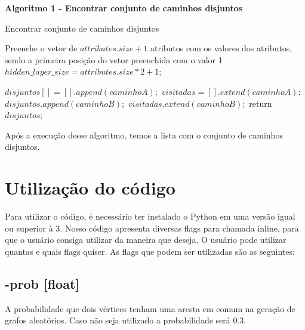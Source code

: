 \begin{center}	
         \textbf{Algoritmo 1 -  Encontrar conjunto de caminhos disjuntos}
	\vspace{-0.3cm}
\begin{minipage}[ht]{13cm}
\begin{algorithm}[H]
  \footnotesize
  \caption{Encontrar conjunto de caminhos disjuntos}
  \label{alg:rnagenerica}
  \begin{algorithmic}[1]
    \STATE Preenche o vetor de $attributes.size+1$ atributos com os valores dos atributos, sendo a primeira posição do vetor preenchida com o valor 1
		\STATE $hidden\_layer\_size =  attributes.size*2+1;$

        \STATE $disjuntos[] = [].append(caminhoA);$
        \STATE $visitadas = [].extend(caminhoA);$
                \STATE $disjuntos.append(caminhoB);$
                \STATE $visitadas.extend(caminhoB);$
            \ENDIF
        \ENDFOR
            \STATE return $disjuntos;$
        \ENDIF
    \ENDFOR
  \end{algorithmic}
\end{algorithm}

\end{minipage}
\end{center}

Após a execução desse algoritmo, temos a lista com o conjunto de caminhos disjuntos.

\section{\esp Utilização do código}
Para utilizar o código, é necessário ter instalado o Python em uma versão igual ou superior à 3. Nosso código apresenta diversas flags para chamada inline, para que o usuário consiga utilizar da maneira que deseja. O usuário pode utilizar quantas e quais flags quiser. As flags que podem ser utilizadas são as seguintes: 

\subsection {\esp -prob [float]} 
A probabilidade que dois vértices tenham uma aresta em comum na geração de grafos aleatórios. Caso não seja utilizado a probabilidade será 0.3.

